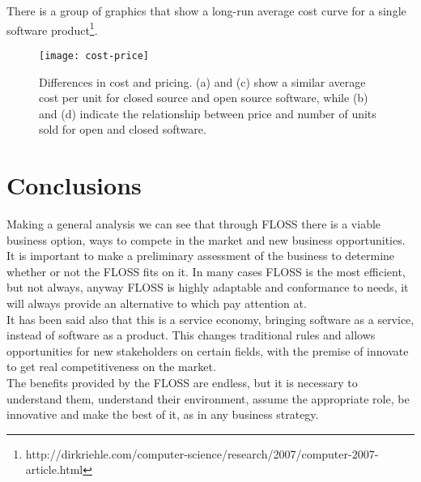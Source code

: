 There is a group of graphics that show a long-run average cost curve for a single software product\footnote{http://dirkriehle.com/computer-science/research/2007/computer-2007-article.html}.

\begin{figure}[h]
\begin{center}
\texttt{[image: cost-price]}
\caption[Differences in cost and pricing]{Differences in cost and pricing. (a) and (c) show a similar average cost per unit for closed source and open source software, while (b) and (d) indicate the relationship between price and number of units sold for open and closed software.}
\label{fig:cost-price}
\end{center}
\end{figure}

\section{Conclusions}\label{Conclusions Chapter 2}

Making a general analysis we can see that through FLOSS there is a viable business option, ways to compete in the market and new business opportunities. It is important to make a preliminary assessment of the business to determine whether or not the FLOSS fits on it. In many cases FLOSS is the most efficient, but not always, anyway FLOSS is highly adaptable and conformance to needs, it will always provide an alternative to which pay attention at.\\

It has been said also that this is a service economy, bringing software as a service, instead of software as a product. This changes traditional rules and allows opportunities for new stakeholders on certain fields, with the premise of innovate to get real competitiveness on the market.\\

The benefits provided by the FLOSS are endless, but it is necessary to understand them, understand their environment, assume the appropriate role, be innovative and make the best of it, as in any business strategy.
